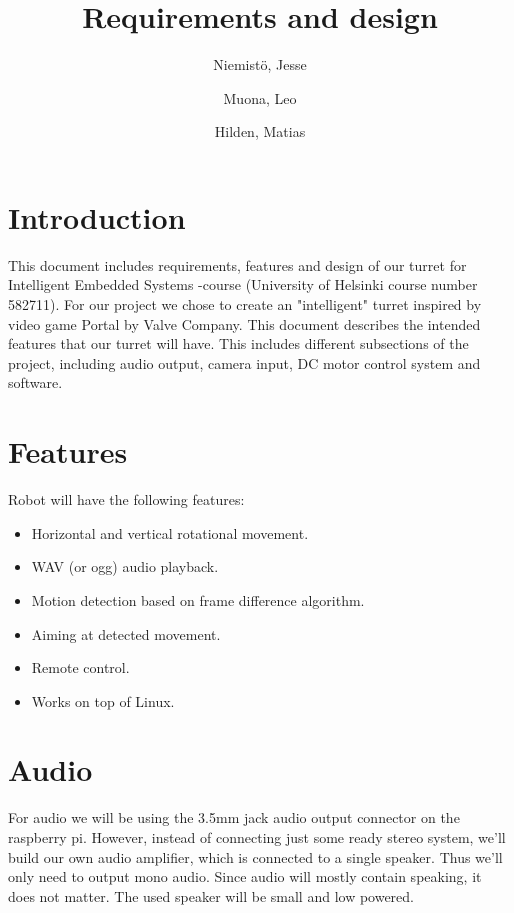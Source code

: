 \documentclass[english,11pt,twoside,a4paper]{article}
\begin{document}
\author{
  Niemistö, Jesse
  \and
  Muona, Leo
  \and
  Hilden, Matias
}
\title{Requirements and design}

\maketitle

\section{Introduction}
This document includes requirements, features and design of our turret for Intelligent Embedded Systems -course (University of Helsinki course number 582711). For our project we chose to create an "intelligent" turret inspired by video game Portal by Valve Company. This document describes the intended features that our turret will have. This includes different subsections of the project, including audio output, camera input, DC motor control system and software.

\section{Features}

Robot will have the following features:

\begin{itemize}
  \item Horizontal and vertical rotational movement.
  \item WAV (or ogg) audio playback.
  \item Motion detection based on frame difference algorithm.
  \item Aiming at detected movement.
  \item Remote control.
  \item Works on top of Linux.
\end{itemize}

\section{Audio}

For audio we will be using the 3.5mm jack audio output connector on the raspberry pi. However, instead of connecting just some ready stereo system, we'll build our own audio amplifier, which is connected to a single speaker. Thus we'll only need to output mono audio. Since audio will mostly contain speaking, it does not matter. The used speaker will be small and low powered.
\end{document}
